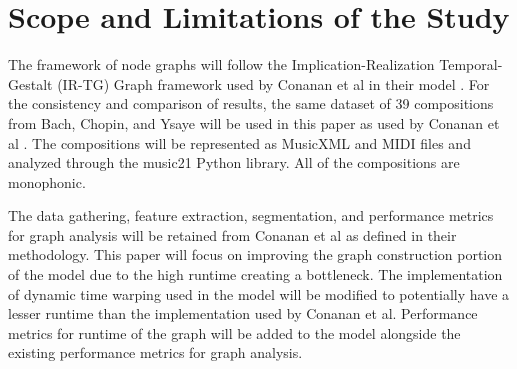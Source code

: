 \section{Scope and Limitations of the Study}

The framework of node graphs will follow the Implication-Realization Temporal-Gestalt (IR-TG) Graph framework used by Conanan et al in their model \cite{FosterNarmour, TenneyPolansky}. For the consistency and comparison of results, the same dataset of 39 compositions from Bach, Chopin, and Ysaye will be used in this paper as used by Conanan et al \cite{ConananEtAl}. The compositions will be represented as MusicXML and MIDI files and analyzed through the music21 Python library. All of the compositions are monophonic.

The data gathering, feature extraction, segmentation, and performance metrics for graph analysis will be retained from Conanan et al as defined in their methodology. This paper will focus on improving the graph construction portion of the model due to the high runtime creating a bottleneck. The implementation of dynamic time warping used in the model will be modified to potentially have a lesser runtime than the implementation used by Conanan et al. Performance metrics for runtime of the graph will be added to the model alongside the existing performance metrics for graph analysis.